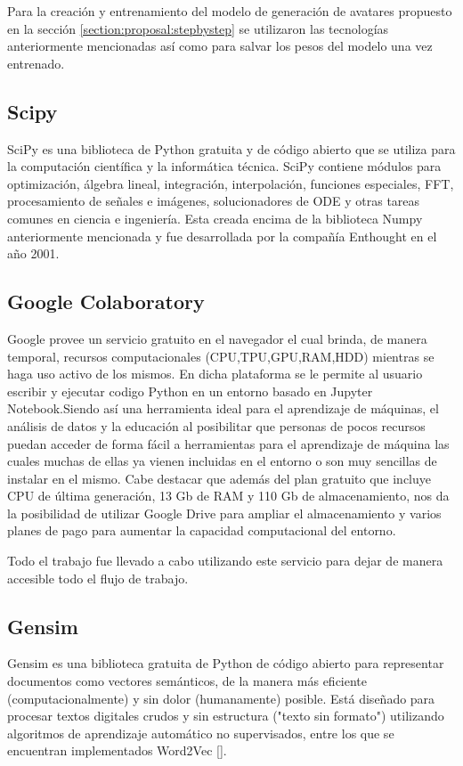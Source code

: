 Para la creación y entrenamiento del modelo de generación de avatares propuesto en la sección \ref{section:proposal:stepbystep} se utilizaron las tecnologías anteriormente mencionadas así como para salvar los pesos del modelo una vez entrenado.

\subsection{Scipy}
SciPy es una biblioteca de Python gratuita y de código abierto que se utiliza para la computación científica y la informática técnica. SciPy contiene módulos para optimización, álgebra lineal, integración, interpolación, funciones especiales, FFT, procesamiento de señales e imágenes, solucionadores de ODE y otras tareas comunes en ciencia e ingeniería. Esta creada encima de la biblioteca Numpy anteriormente mencionada y fue desarrollada por la compañía Enthought en el año 2001.

\subsection{Google Colaboratory}

Google provee un servicio gratuito en el navegador el cual brinda, de manera temporal, recursos computacionales (CPU,TPU,GPU,RAM,HDD) mientras se haga uso activo de los mismos. En dicha plataforma se le permite al usuario escribir y ejecutar codigo Python en un entorno basado en Jupyter Notebook.Siendo así una herramienta ideal para el aprendizaje de máquinas, el análisis de datos y la educación al posibilitar que personas de pocos recursos puedan acceder de forma fácil a herramientas para el aprendizaje de máquina las cuales muchas de ellas ya vienen incluidas en el entorno o son muy  sencillas de instalar en el mismo.
Cabe destacar que además del plan gratuito que incluye CPU de última generación, 13 Gb de RAM y 110 Gb de almacenamiento, nos da la posibilidad de utilizar Google Drive para ampliar el almacenamiento y  varios planes de pago para aumentar la capacidad computacional del entorno.
 
Todo el trabajo fue llevado a cabo utilizando este servicio para dejar de manera accesible todo el flujo de trabajo.

\subsection{Gensim}
Gensim es una biblioteca gratuita de Python de código abierto para representar documentos como vectores semánticos, de la manera más eficiente (computacionalmente) y sin dolor (humanamente) posible. Está diseñado para procesar textos digitales crudos y sin estructura ("texto sin formato") utilizando algoritmos de aprendizaje automático no supervisados, entre los que se encuentran implementados Word2Vec [\cite{rehurek_lrec}].

